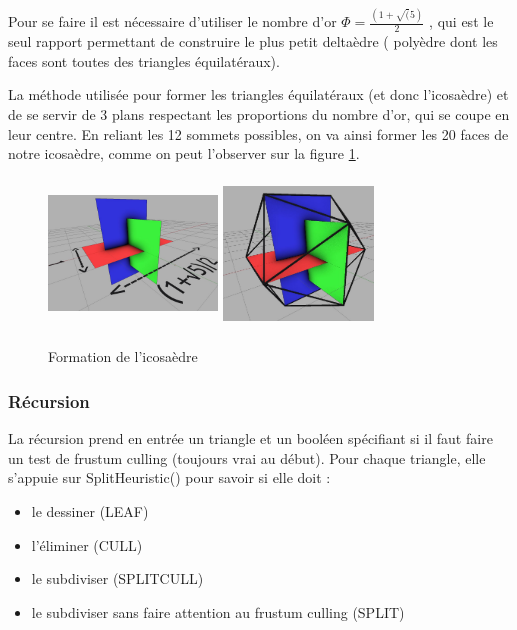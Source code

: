 	Pour se faire il est nécessaire d'utiliser le nombre d'or $\Phi = \frac{(1+\sqrt(5)}{2}$ , qui est le seul rapport permettant de construire le plus petit deltaèdre ( polyèdre dont les faces sont toutes des triangles équilatéraux).
	
	La méthode utilisée pour former les triangles équilatéraux (et donc l'icosaèdre) et de se servir de 3 plans respectant les proportions du nombre d'or, qui se coupe en leur centre. En reliant les 12 sommets possibles, on va ainsi former les 20 faces de notre icosaèdre, comme on peut l'observer sur la figure \ref{fig:plans-icosaèdre}.
	
	\begin{figure}[H]
        \centerline{
            \includegraphics[height=4cm,width=4.5cm]{img/3plans.png}
            \includegraphics[height=4cm,width=4cm]{img/3plans2.png}}
        \caption{Formation de l'icosaèdre \protect\footnotemark}
        \label{fig:plans-icosaèdre}
	\end{figure}
	
	
	\subsubsection{Récursion}
	
	La récursion prend en entrée un triangle et un booléen spécifiant si il faut faire un test de frustum culling (toujours vrai au début). Pour chaque triangle, elle s'appuie sur SplitHeuristic() pour savoir si elle doit :
	\begin{itemize} 
	\item le dessiner (LEAF)
	\item l'éliminer (CULL)
	\item le subdiviser (SPLITCULL)
	\item le subdiviser sans faire attention au frustum culling (SPLIT)
	\end{itemize}

